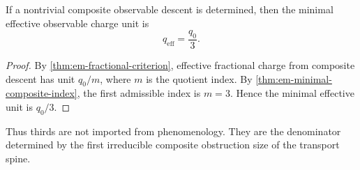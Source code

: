 \begin{corollary}
	If a nontrivial composite observable descent is determined, then the minimal
	effective observable charge unit is
	\[
		q_{\mathrm{eff}}=\frac{q_0}{3}.
	\]
\end{corollary}
\begin{proof}
	By \cref{thm:em-fractional-criterion}, effective fractional charge from
	composite descent has unit \(q_0/m\), where \(m\) is the quotient index.
	By \cref{thm:em-minimal-composite-index}, the first admissible index is
	\(m=3\).
	Hence the minimal effective unit is \(q_0/3\).
\end{proof}
\begin{remark}
	Thus thirds are not imported from phenomenology.
	They are the denominator determined by the first irreducible composite
	obstruction size of the transport spine.
\end{remark}
